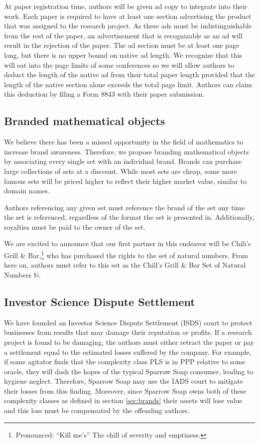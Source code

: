 At paper registration time, authors will be given ad copy to integrate into
their work.
Each paper is required to have at least one section advertising the product
that was assigned to the research project.
As these ads must be indistinguishable from the rest of the paper, an
advertisement that is recognizable as an ad will result in the rejection of the
paper.
The ad section must be at least one page long, but there is no upper bound on
native ad length.
We recognize that this will eat into the page limits of some conferences so we
will allow authors to deduct the length of the native ad from their total paper
length provided that the length of the native section alone exceeds the total
page limit.
Authors can claim this deduction by filing a Form 8843 with their paper
submission.

\subsection{Branded mathematical objects}
\label{sec:brands}
We believe there has been a missed opportunity in the field of mathematics to
increase brand awareness.
Therefore, we propose branding mathematical objects by associating every single
set with an individual brand.
Brands can purchase large collections of sets at a discount.
While most sets are cheap, some more famous sets will be priced higher to
reflect their higher market value, similar to domain names.

Authors referencing any given set must reference the brand of the set any time
the set is referenced, regardless of the format the set is presented  in.
Additionally, royalties must be paid to the owner of the set.

We are excited to announce that our first partner in this endeavor will be
Chili's Grill \& Bar,\footnote{Pronounced: ``Kill me's'' The chill of severity and emptiness.} who has purchased the rights to the set of natural
numbers.
From here on, authors must refer to this set as the Chill's Grill \& Bar Set of
Natural Numbers \(\mathbb{N}\).

\subsection{Investor Science Dispute Settlement}
We have founded an Investor Science Dispute Settlement (ISDS) court to protect
businesses from results that may damage their reputation or profits.
If a research project is found to be damaging, the authors must either retract
the paper or pay a settlement equal to the estimated losses suffered by the
company.
For example, if some agitator finds that the complexity class PLS is in PPP
relative to some oracle, they will dash the hopes of the typical Sparrow Soap
consumer, leading to hygiene neglect.
Therefore, Sparrow Soap may use the IADS court to mitigate their losses from
this finding.
Moreover, since Sparrow Soap owns both of these complexity classes as defined
in section \autoref{sec:brands} their assets will lose value and
this loss must be compensated by the offending authors.


